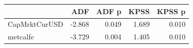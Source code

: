 \begin{tabular}{lrrrr}
\toprule
 & ADF & ADF p & KPSS & KPSS p \\
\midrule
CapMrktCurUSD & -2.868 & 0.049 & 1.689 & 0.010 \\
metcalfe & -3.729 & 0.004 & 1.405 & 0.010 \\
\bottomrule
\end{tabular}
